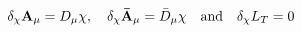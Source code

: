 \begin{equation}
\delta _{\chi }{\bf A}_{\mu }=D_{\mu }\chi ,\ \ \ \delta _{\chi
}{\bf \bar{A}}_{\mu }=\bar{D}_{\mu }\chi \ \ \ \mbox{and}\ \ \
\delta _{\chi }L_{T}=0
\end{equation}

